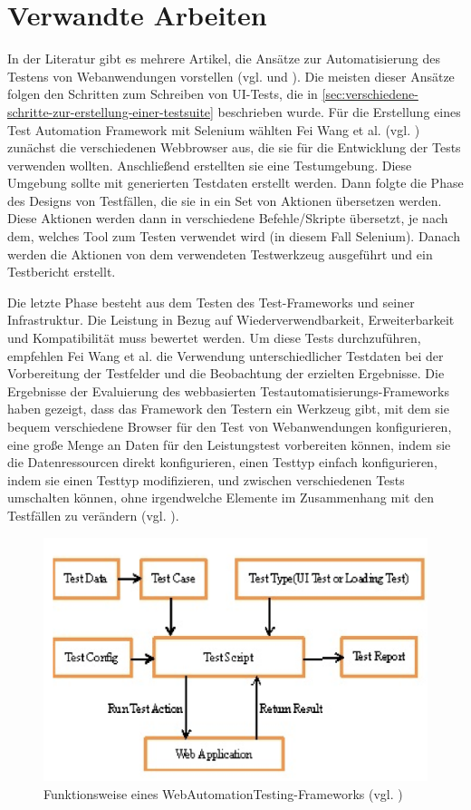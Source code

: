 \section{Verwandte Arbeiten}

In der Literatur gibt es mehrere Artikel, die Ansätze
zur Automatisierung des Testens von Webanwendungen
vorstellen (vgl. \cite{6140672} und \cite{6211171}).
Die meisten dieser Ansätze folgen den Schritten zum
Schreiben von UI-Tests, die in \autoref{sec:verschiedene-schritte-zur-erstellung-einer-testsuite}
beschrieben  wurde. Für die Erstellung eines Test Automation
Framework mit Selenium wählten Fei Wang et al.
(vgl. \cite{6211171}) zunächst die verschiedenen
Webbrowser aus, die sie für die Entwicklung der
Tests verwenden wollten. Anschließend erstellten
sie eine Testumgebung. Diese Umgebung sollte mit
generierten Testdaten erstellt werden. Dann folgte
die Phase des Designs von Testfällen, die sie in
ein Set von Aktionen übersetzen werden. Diese Aktionen
werden dann in verschiedene Befehle/Skripte übersetzt,
je nach dem, welches Tool zum Testen verwendet wird
(in diesem Fall Selenium). Danach werden die Aktionen
von dem verwendeten Testwerkzeug ausgeführt und
ein Testbericht erstellt.


Die letzte Phase besteht aus dem Testen des
Test-Frameworks und seiner Infrastruktur. Die
Leistung in Bezug auf Wiederverwendbarkeit,
Erweiterbarkeit und Kompatibilität muss bewertet werden.
Um diese Tests durchzuführen, empfehlen Fei Wang
et al. die Verwendung unterschiedlicher Testdaten bei
der Vorbereitung der Testfelder und die Beobachtung der
erzielten Ergebnisse. Die Ergebnisse der Evaluierung
des webbasierten Testautomatisierungs-Frameworks haben
gezeigt, dass das Framework den Testern ein Werkzeug
gibt, mit dem sie bequem verschiedene Browser für den
Test von Webanwendungen konfigurieren, eine große
Menge an Daten für den Leistungstest vorbereiten
können, indem sie die Datenressourcen direkt
konfigurieren, einen Testtyp einfach konfigurieren,
indem sie einen Testtyp modifizieren, und zwischen
verschiedenen Tests umschalten können, ohne
irgendwelche Elemente im Zusammenhang mit den
Testfällen zu verändern (vgl. \cite{6211171}).

\begin{figure}[H]
    \centering
    \includegraphics[scale=0.5]{images/web-based}
    \caption{Funktionsweise eines WebAutomationTesting-Frameworks (vgl. \cite{6211171})} \label{fig:web-based}
\end{figure}


